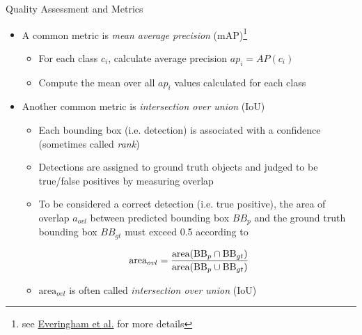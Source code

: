 \documentclass[handout]{beamer}
\begin{document}
\begin{frame}{Quality Assessment and Metrics}
\begin{itemize}
\itemsep 1em
	\item<1->A common metric is \emph{mean average precision} (mAP)\footnote{see \href{http://host.robots.ox.ac.uk/pascal/VOC/pubs/everingham10.html\#abstract}{\color{blue}Everingham et al.} for more details}
	\begin{itemize}[square]
		\item<1->For each class $c_i$, calculate average precision $ap_i = AP(c_i)$
		\item<2->Compute the mean over all $ap_i$ values calculated for each class
	\end{itemize}
	\item<2->Another common metric is \emph{intersection over union} (IoU)
	\begin{itemize}[square]
		\item<1->Each bounding box (i.e. detection) is associated with a confidence (sometimes called \emph{rank})
		\item<2->Detections are assigned to ground truth objects and judged to be true/false positives by measuring overlap
		\item<3->To be considered a correct detection (i.e. true positive), the area of overlap $a_{ovl}$ between predicted bounding box $BB_p$ and the ground truth bounding box $BB_{gt}$ must exceed 0.5 according to 
	\end{itemize}
	\begin{equation}
		\centering
		\text{area}_{ovl} = \frac{\text{area}(\text{BB}_p \cap \text{BB}_{gt})}{\text{area}(\text{BB}_p \cup \text{BB}_{gt})}
	\end{equation}
	\begin{itemize}[square]
		\item<4-> $\text{area}_{ovl}$ is often called \emph{intersection over union} (IoU)
	\end{itemize}
\end{itemize}
\end{frame}
\end{document}
